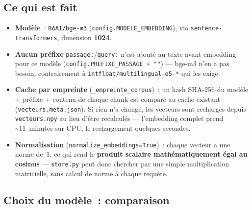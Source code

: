 \documentclass[11pt]{article}
\begin{document}
\subsection*{Ce qui est fait}

\begin{itemize}
  \item \textbf{Modèle}~: \texttt{BAAI/bge-m3} (\texttt{config.MODELE\_EMBEDDING}), via
        \texttt{sentence-transformers}, dimension \textbf{1024}.

  \item \textbf{Aucun préfixe} \texttt{passage:}/\texttt{query:} n'est ajouté au texte avant
        embedding pour ce modèle (\texttt{config.PREFIXE\_PASSAGE = ""}) --- bge-m3 n'en a pas
        besoin, contrairement à \texttt{intfloat/multilingual-e5-*} qui les exige.

  \item \textbf{Cache par empreinte} (\texttt{\_empreinte\_corpus})~: un hash SHA-256 du modèle +
        préfixe + contenu de chaque chunk est comparé au cache existant
        (\texttt{vecteurs.meta.json}). Si rien n'a changé, les vecteurs sont rechargés depuis
        \texttt{vecteurs.npy} au lieu d'être recalculés --- l'embedding complet prend
        \textasciitilde11~minutes sur CPU, le rechargement quelques secondes.

  \item \textbf{Normalisation} (\texttt{normalize\_embeddings=True})~: chaque vecteur a une norme
        de~1, ce qui rend le \textbf{produit scalaire mathématiquement égal au cosinus} ---
        \texttt{store.py} peut donc chercher par une simple multiplication matricielle, sans
        calcul de norme à chaque requête.
\end{itemize}

\subsection*{Choix du modèle~: comparaison}
\end{document}
